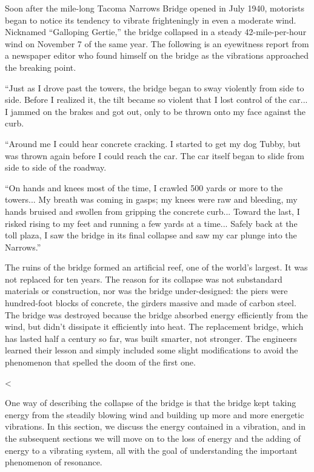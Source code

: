 Soon after the mile-long Tacoma Narrows Bridge opened in
July 1940, motorists began to notice its tendency to vibrate
frighteningly in even a moderate wind. Nicknamed ``Galloping
Gertie,'' the bridge collapsed in a steady 42-mile-per-hour
wind on November 7 of the same year. The following is an
eyewitness report from a newspaper editor who found himself
on the bridge as the vibrations approached the breaking point.

``Just as I drove past the towers, the bridge began to sway
violently from side to side. Before I realized it, the tilt
became so violent that I lost control of the car... I jammed
on the brakes and got out, only to be thrown onto my
face against the curb.

``Around me I could hear concrete cracking. I started to get
my dog Tubby, but was thrown again before I could reach the
car. The car itself began to slide from side to side of the roadway.

``On hands and knees most of the time, I crawled 500 yards
or more to the towers... My breath was coming in gasps; my
knees were raw and bleeding, my hands bruised and swollen
from gripping the concrete curb... Toward the last, I risked
rising to my feet and running a few yards at a time...
Safely back at the toll plaza, I saw the bridge in its final
collapse and saw my car plunge into the Narrows.''

The ruins of the bridge formed an artificial reef, one of
the world's largest. It was not replaced for ten years. The
reason for its collapse was not substandard materials or
construction, nor was the bridge under-designed: the piers
were hundred-foot blocks of concrete, the girders massive
and made of carbon steel. The bridge was destroyed because
the bridge absorbed energy efficiently from the wind, but
didn't dissipate it efficiently into heat.
The replacement bridge, which has lasted half a century so
far, was built smarter, not stronger. The engineers learned
their lesson and simply included some slight modifications
to avoid the phenomenon that spelled the
doom of the first one.

<%

One way of describing the collapse of the bridge is that the
bridge kept taking energy from the steadily blowing wind and
building up more and more energetic vibrations. In this
section, we discuss the energy contained in a vibration, and
in the subsequent sections we will move on to the loss of
energy and the adding of energy to a vibrating system, all
with the goal of understanding the important phenomenon of resonance.

